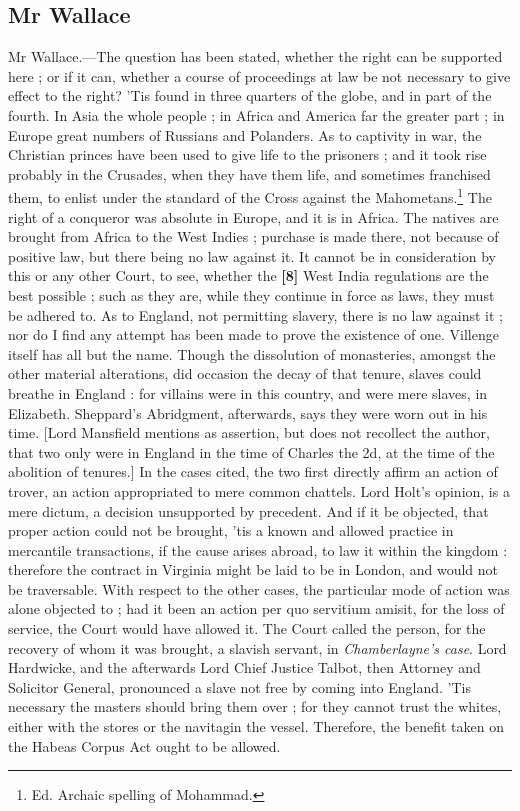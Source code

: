 \documentclass[a4paper]{article}
\begin{document}
\subsection{Mr Wallace}
Mr Wallace.---The question has been stated, whether the right can be supported here ; or if it can, whether a course of proceedings at law be not necessary to give effect to the right? 'Tis found in three quarters of the globe, and in part of the fourth. In Asia the whole people ; in Africa and America far the greater part ; in Europe great numbers of Russians and Polanders. As to captivity in war, the Christian princes have been used to give life to the prisoners ; and it took rise probably in the Crusades, when they have them life, and sometimes franchised them, to enlist under the standard of the Cross against the Mahometans.\footnote{Ed. Archaic spelling of Mohammad.} The right of a conqueror was absolute in Europe, and it is in Africa. The natives are brought from Africa to the West Indies ; purchase is made there, not because of positive law, but there being no law against it. It cannot be in consideration by this or any other Court, to see, whether the \textbf{[8]} West India regulations are the best possible ; such as they are, while they continue in force as laws, they must be adhered to. As to England, not permitting slavery, there is no law against it ; nor do I find any attempt has been made to prove the existence of one. Villenge itself has all but the name. Though the dissolution of monasteries, amongst the other material alterations, did occasion the decay of that tenure, slaves could breathe in England : for villains were in this country, and were mere slaves, in Elizabeth. Sheppard's Abridgment, afterwards, says they were worn out in his time. [Lord Mansfield mentions as assertion, but does not recollect the author, that two only were in England in the time of Charles the 2d, at the time of the abolition of tenures.] In the cases cited, the two first directly affirm an action of trover, an action appropriated to mere common chattels. Lord Holt's opinion, is a mere dictum, a decision unsupported by precedent. And if it be objected, that proper action could not be brought, 'tis a known and allowed practice in mercantile transactions, if the cause arises abroad, to law it within the kingdom : therefore the contract in Virginia might be laid to be in London, and would not be traversable. With respect to the other cases, the particular mode of action was alone objected to ; had it been an action per quo servitium amisit, for the loss of service, the Court would have allowed it. The Court called the person, for the recovery of whom it was brought, a slavish servant, in \emph{Chamberlayne's case}. Lord Hardwicke, and the afterwards Lord Chief Justice Talbot, then Attorney and Solicitor General, pronounced a slave not free by coming into England. 'Tis necessary the masters should bring them over ; for they cannot trust the whites, either with the stores or the navitagin the vessel. Therefore, the benefit taken on the Habeas Corpus Act ought to be allowed.
\end{document}
